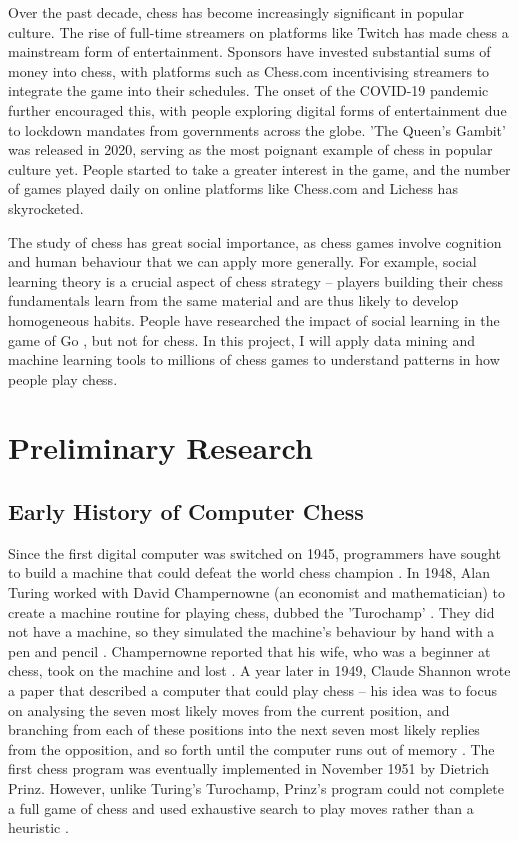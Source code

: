 \documentclass[%
 superscriptaddress,
showpacs,preprintnumbers,
 amsmath,
 amssymb,
 aps,
 pra,
showkeys,
onecolumn,
notitlepage,
11pt,
tightenlines      %
]{revtex4-1}
\begin{document}
Over the past decade, chess has become increasingly significant in popular culture. The rise of full-time streamers on platforms like Twitch has made chess a mainstream form of entertainment. Sponsors have invested substantial sums of money into chess, with platforms such as Chess.com incentivising streamers to integrate the game into their schedules. The onset of the COVID-19 pandemic further encouraged this, with people exploring digital forms of entertainment due to lockdown mandates from governments across the globe. 'The Queen's Gambit' was released in 2020, serving as the most poignant example of chess in popular culture yet. People started to take a greater interest in the game, and the number of games played daily on online platforms like Chess.com and Lichess has skyrocketed. 

The study of chess has great social importance, as chess games involve cognition and human behaviour that we can apply more generally. For example, social learning theory is a crucial aspect of chess strategy -- players building their chess fundamentals learn from the same material and are thus likely to develop homogeneous habits. People have researched the impact of social learning in the game of Go \cite{beheim2014strategic}, but not for chess. In this project, I will apply data mining and machine learning tools to millions of chess games to understand patterns in how people play chess.

\section{Preliminary Research}

\subsection{Early History of Computer Chess}
Since the first digital computer was switched on 1945, programmers have sought to build a machine that could defeat the world chess champion \cite{earlyComputerChessHistory}. In 1948, Alan Turing worked with David Champernowne (an economist and mathematician) to create a machine routine for playing chess, dubbed the 'Turochamp' \cite{turingalan}. They did not have a machine, so they simulated the machine's behaviour by hand with a pen and pencil \cite{turingalan}. Champernowne reported that his wife, who was a beginner at chess, took on the machine and lost \cite{copeland2005turing}. A year later in 1949, Claude Shannon wrote a paper that described a computer that could play chess -- his idea was to focus on analysing the seven most likely moves from the current position, and branching from each of these positions into the next seven most likely replies from the opposition, and so forth until the computer runs out of memory \cite{shannon1950xxii}. The first chess program was eventually implemented in November 1951 by Dietrich Prinz. However, unlike Turing's Turochamp, Prinz's program could not complete a full game of chess and used exhaustive search to play moves rather than a heuristic \cite{copeland2005turing}.
\end{document}
